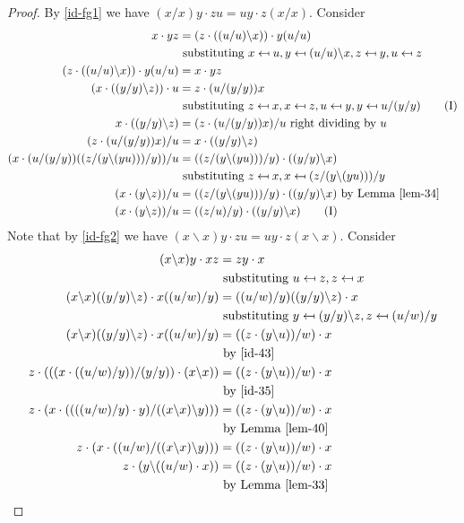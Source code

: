 \documentclass[12pt]{report}
\theoremstyle{definition}
\newcommand{\ldv}{\backslash}       %
\newcommand{\rdv}{/}                %
\begin{document}
\begin{proof}
  By \ref{id-fg1} we have $(x\rdv x)y\cdot zu = uy \cdot z(x\rdv x)$. Consider
  \begin{align*}
    x\cdot yz &= (z\cdot ((u\rdv u)\ldv x))\cdot y(u\rdv u)\\
    &\text{ substituting $x\mapsfrom u, y\mapsfrom (u\rdv u)\ldv x, z\mapsfrom y, u\mapsfrom z$}\\
    (z\cdot ((u\rdv u)\ldv x))\cdot y(u\rdv u) &= x\cdot yz\\
    (x\cdot((y\rdv y)\ldv z))\cdot u &= z\cdot (u\rdv(y\rdv y))x\\
    &\text{ substituting
      $z\mapsfrom x, x\mapsfrom z, u\mapsfrom y, y\mapsfrom u\rdv(y\rdv y)$}\label{id-35} \tag{I}\\
    x\cdot ((y\rdv y)\ldv z) &= (z\cdot (u\rdv (y\rdv y))x)\rdv u\text{ right dividing by $u$}\\
    (z\cdot (u\rdv (y\rdv y))x)\rdv u &= x\cdot ((y\rdv y)\ldv z)\\
    (x\cdot (u\rdv (y\rdv y))((z\rdv (y\ldv (yu)))\rdv y))\rdv u &=
      ((z\rdv (y\ldv (yu)))\rdv y)\cdot ((y\rdv y)\ldv x)\\
    &\text{ substituting $z\mapsfrom x, x\mapsfrom (z\rdv (y\ldv(yu)))\rdv y$}\\
    (x\cdot (y\ldv z))\rdv u &= ((z\rdv (y\ldv (yu)))\rdv y)\cdot ((y\rdv y)\ldv x)
      \text{ by Lemma \ref{lem-34}}\\
    (x\cdot (y\ldv z))\rdv u &= ((z\rdv u)\rdv y)\cdot ((y\rdv y)\ldv x)\label{id-43} \tag{I}
  \end{align*}
  Note that by \ref{id-fg2} we have $(x\ldv x)y\cdot zu = uy\cdot z(x\ldv x)$.
    Consider
  \begin{align*}
    (x\ldv x)y\cdot xz &= zy\cdot x\\
      &\text{ substituting $u\mapsfrom z, z\mapsfrom x$}\\
    (x\ldv x)((y\rdv y)\ldv z)\cdot x((u\rdv w)\rdv y) &=
      ((u\rdv w)\rdv y)((y\rdv y)\ldv z)\cdot x\\
    &\text{ substituting $y\mapsfrom (y\rdv y)\ldv z, z\mapsfrom (u\rdv w)\rdv y$}\\
    (x\ldv x)((y\rdv y)\ldv z)\cdot x((u\rdv w)\rdv y) &= ((z\cdot (y\ldv u))\rdv w)\cdot x\\
      &\text{ by \ref{id-43}}\\
    z\cdot (((x\cdot ((u\rdv w)\rdv y))\rdv (y\rdv y))\cdot (x\ldv x)) &=
      ((z\cdot (y\ldv u))\rdv w)\cdot x\\
      &\text{ by \ref{id-35}}\\
    z\cdot (x\cdot ((((u\rdv w)\rdv y)\cdot y)\rdv ((x\ldv x)\ldv y))) &=
      ((z\cdot (y\ldv u))\rdv w)\cdot x\\
      &\text{ by Lemma \ref{lem-40}}\\
    z\cdot (x\cdot ((u\rdv w)\rdv ((x\ldv x)\ldv y))) &=
      ((z\cdot (y\ldv u))\rdv w)\cdot x\\
    z\cdot (y\ldv ((u\rdv w)\cdot x)) &= ((z\cdot (y\ldv u))\rdv w)\cdot x\\
      &\text{ by Lemma \ref{lem-33}}
  \end{align*}
\end{proof}
\end{document}

